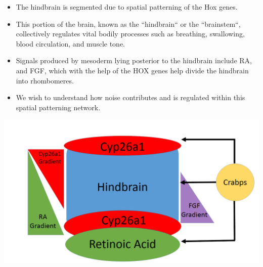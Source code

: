 \begin{itemize}
\item The hindbrain is segmented due to spatial patterning of the Hox genes.
\item This portion of the brain, known as the ``hindbrain`` or the ``brainstem``, collectively regulates vital bodily processes
such as breathing, swallowing, blood circulation, and muscle tone.
\item Signals produced by mesoderm lying posterior to the hindbrain include RA, and FGF, which with the help of the HOX genes help divide
the hindbrain into rhombomeres. 
\item We wish to understand how noise contributes and is regulated within this spatial patterning network.
\end{itemize}

\begin{center}
\includegraphics[scale=0.25]{figures/RAcartoons}
\par\end{center}